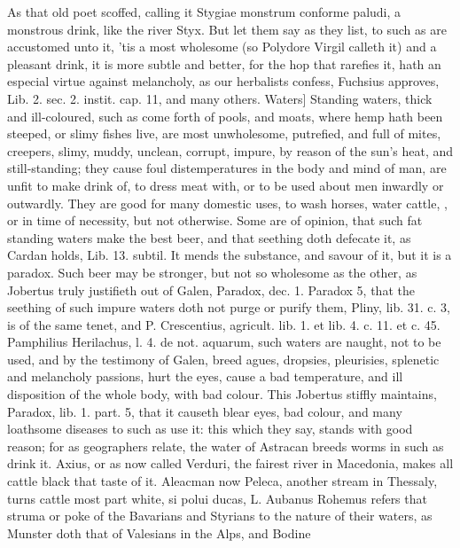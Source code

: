 {As that old poet scoffed, calling it Stygiae monstrum conforme
paludi, a monstrous drink, like the river Styx. But let them say as
they list, to such as are accustomed unto it, 'tis a most wholesome (so
 Polydore Virgil calleth it) and a pleasant drink, it is more
subtle and better, for the hop that rarefies it, hath an especial
virtue against melancholy, as our herbalists confess, Fuchsius
approves, Lib. 2. sec. 2. instit. cap. 11, and many others.
Waters] Standing waters, thick and ill-coloured, such as come forth of
pools, and moats, where hemp hath been steeped, or slimy fishes live,
are most unwholesome, putrefied, and full of mites, creepers, slimy,
muddy, unclean, corrupt, impure, by reason of the sun's heat, and
still-standing; they cause foul distemperatures in the body and mind of
man, are unfit to make drink of, to dress meat with, or to be
used about men inwardly or outwardly. They are good for many
domestic uses, to wash horses, water cattle, \etc{}, or in time of
necessity, but not otherwise. Some are of opinion, that such fat
standing waters make the best beer, and that seething doth defecate it,
as Cardan holds, Lib. 13. subtil. It mends the substance, and
savour of it, but it is a paradox. Such beer may be stronger, but not
so wholesome as the other, as Jobertus truly justifieth out of
Galen, Paradox, dec. 1. Paradox 5, that the seething of such impure
waters doth not purge or purify them, Pliny, lib. 31. c. 3, is of the
same tenet, and P. Crescentius, agricult. lib. 1. et lib. 4. c. 11. et
c. 45. Pamphilius Herilachus, l. 4. de not. aquarum, such waters are
naught, not to be used, and by the testimony of Galen, breed
agues, dropsies, pleurisies, splenetic and melancholy passions, hurt
the eyes, cause a bad temperature, and ill disposition of the whole
body, with bad colour. This Jobertus stiffly maintains, Paradox, lib.
1. part. 5, that it causeth blear eyes, bad colour, and many loathsome
diseases to such as use it: this which they say, stands with good
reason; for as geographers relate, the water of Astracan breeds worms
in such as drink it.  Axius, or as now called Verduri, the
fairest river in Macedonia, makes all cattle black that taste of it.
Aleacman now Peleca, another stream in Thessaly, turns cattle most part
white, si polui ducas, L. Aubanus Rohemus refers that struma or
poke of the Bavarians and Styrians to the nature of their waters, as
Munster doth that of Valesians in the Alps, and Bodine
}

